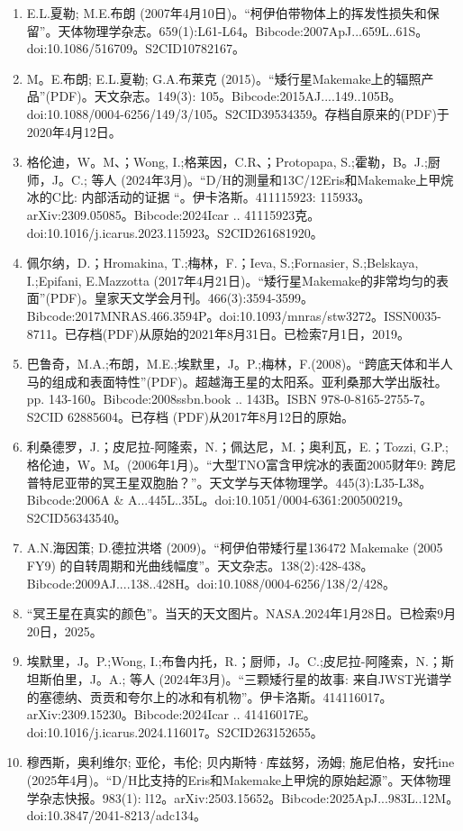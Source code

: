 \begin{enumerate}
\item E.L.夏勒; M.E.布朗 (2007年4月10日)。“柯伊伯带物体上的挥发性损失和保留”。天体物理学杂志。659(1):L61-L64。Bibcode:2007ApJ...659L..61S。doi:10.1086/516709。S2CID10782167。  
\item M。E.布朗; E.L.夏勒; G.A.布莱克 (2015)。“矮行星Makemake上的辐照产品”(PDF)。天文杂志。149(3): 105。Bibcode:2015AJ....149..105B。doi:10.1088/0004-6256/149/3/105。S2CID39534359。存档自原来的(PDF)于2020年4月12日。  
\item 格伦迪，W。M、；Wong, I.;格莱因，C.R、；Protopapa, S.;霍勒，B。J.;厨师，J。C.; 等人 (2024年3月)。“D/H的测量和13C/12Eris和Makemake上甲烷冰的C比: 内部活动的证据 “。伊卡洛斯。411115923: 115933。arXiv:2309.05085。Bibcode:2024Icar .. 41115923克。doi:10.1016/j.icarus.2023.115923。S2CID261681920。 
\item 佩尔纳，D.；Hromakina, T.;梅林，F.；Ieva, S.;Fornasier, S.;Belskaya, I.;Epifani, E.Mazzotta (2017年4月21日)。“矮行星Makemake的非常均匀的表面”(PDF)。皇家天文学会月刊。466(3):3594-3599。Bibcode:2017MNRAS.466.3594P。doi:10.1093/mnras/stw3272。ISSN0035-8711。已存档(PDF)从原始的2021年8月31日。已检索7月1日，2019。  
\item 巴鲁奇，M.A.;布朗，M.E.;埃默里，J。P.;梅林，F.(2008)。“跨底天体和半人马的组成和表面特性”(PDF)。超越海王星的太阳系。亚利桑那大学出版社。pp. 143-160。Bibcode:2008ssbn.book .. 143B。ISBN  978-0-8165-2755-7。S2CID 62885604。已存档 (PDF)从2017年8月12日的原始。
\item 利桑德罗，J.；皮尼拉-阿隆索，N.；佩达尼，M.；奥利瓦，E.；Tozzi, G.P.;格伦迪，W。M。(2006年1月)。“大型TNO富含甲烷冰的表面2005财年9: 跨尼普特尼亚带的冥王星双胞胎？”。天文学与天体物理学。445(3):L35-L38。Bibcode:2006A & A...445L..35L。doi:10.1051/0004-6361:200500219。S2CID56343540。  
\item A.N.海因策; D.德拉洪塔 (2009)。“柯伊伯带矮行星136472 Makemake (2005 FY9) 的自转周期和光曲线幅度”。天文杂志。138(2):428-438。Bibcode:2009AJ....138..428H。doi:10.1088/0004-6256/138/2/428。
\item “冥王星在真实的颜色”。当天的天文图片。NASA.2024年1月28日。已检索9月20日，2025。
\item 埃默里，J。P.;Wong, I.;布鲁内托，R.；厨师，J。C.;皮尼拉-阿隆索，N.；斯坦斯伯里，J。A.; 等人 (2024年3月)。“三颗矮行星的故事: 来自JWST光谱学的塞德纳、贡贡和夸尔上的冰和有机物”。伊卡洛斯。414116017。arXiv:2309.15230。Bibcode:2024Icar .. 41416017E。doi:10.1016/j.icarus.2024.116017。S2CID263152655。 
\item 穆西斯，奥利维尔; 亚伦，韦伦; 贝内斯特·库兹努，汤姆; 施尼伯格，安托ine (2025年4月)。“D/H比支持的Eris和Makemake上甲烷的原始起源”。天体物理学杂志快报。983(1): l12。arXiv:2503.15652。Bibcode:2025ApJ...983L..12M。doi:10.3847/2041-8213/adc134。

\end{enumerate}

